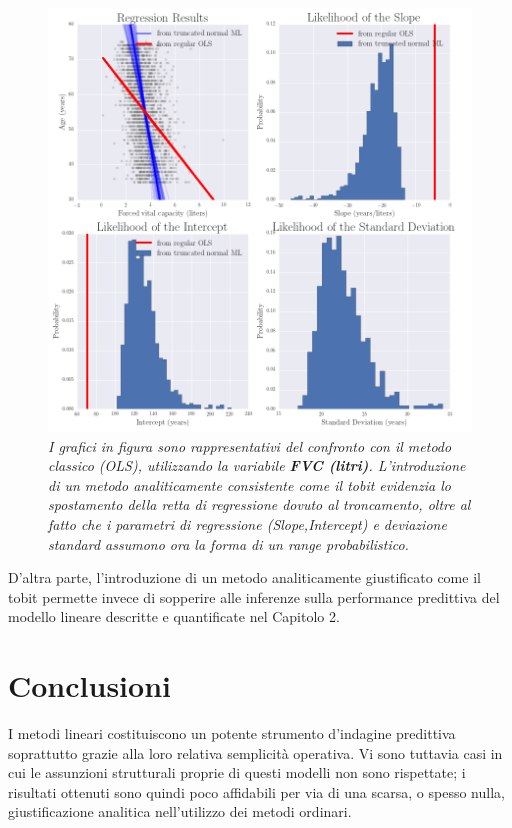 \documentclass[12pt,openright,twoside,a4paper]{book}
\begin{document}
\begin{figure}[!h]
\centering
\includegraphics[width=1.0\linewidth]{truncatedml}
\caption{\textit{I grafici in figura sono rappresentativi del confronto con il metodo classico (OLS), utilizzando la variabile \textbf{FVC (litri)}.
L'introduzione di un metodo analiticamente consistente come il tobit evidenzia lo spostamento della retta di regressione dovuto al troncamento, oltre al fatto che i parametri di regressione (Slope,Intercept) e deviazione standard assumono ora la forma di un range probabilistico.}}
\label{truncatedml}
\end{figure}

D'altra parte, l'introduzione di un metodo analiticamente giustificato come il tobit permette invece di sopperire alle inferenze sulla performance predittiva del modello lineare descritte e quantificate nel Capitolo 2.



\chapter{Conclusioni}

I metodi lineari costituiscono un potente strumento d'indagine predittiva soprattutto grazie alla loro relativa semplicità operativa.
Vi sono tuttavia casi in cui le assunzioni strutturali proprie di questi modelli non sono rispettate;
i risultati ottenuti sono quindi poco affidabili per via di una scarsa, o spesso nulla, giustificazione analitica nell'utilizzo dei metodi ordinari.
\end{document}
